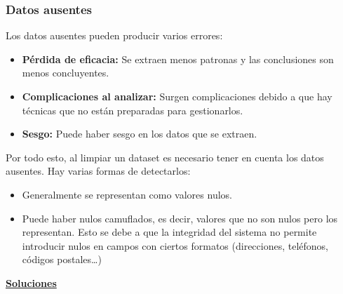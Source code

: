 \documentclass[12pt, letterpaper]{article}
\begin{document}
\subsubsection{Datos ausentes}
Los datos ausentes pueden producir varios errores:
\begin{itemize}
    \item \textbf{Pérdida de eficacia:} Se extraen menos patronas y las conclusiones son menos concluyentes.
    \item \textbf{Complicaciones al analizar:} Surgen complicaciones debido a que hay técnicas que no están preparadas para gestionarlos.
    \item \textbf{Sesgo:} Puede haber sesgo en los datos que se extraen.
\end{itemize}

Por todo esto, al limpiar un dataset es necesario tener en cuenta los datos ausentes. Hay varias formas de detectarlos:
\begin{itemize}
    \item Generalmente se representan como valores nulos.
    \item Puede haber nulos camuflados, es decir, valores que no son nulos pero los representan. Esto se debe a que la integridad del sistema no permite introducir nulos en campos con ciertos formatos (direcciones, teléfonos, códigos postales\ldots)
\end{itemize}

\vspace{1em}
\underline{\textbf{Soluciones}}
\end{document}
